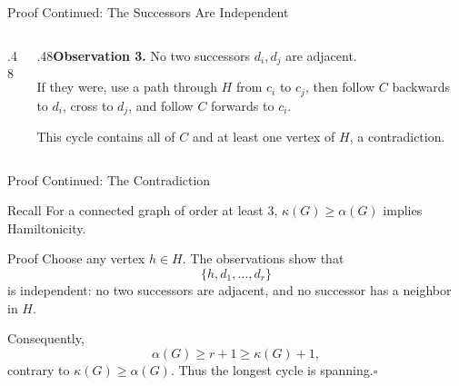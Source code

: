 \documentclass[aspectratio=169,11pt]{beamer}
\begin{document}
\begin{frame}{Proof Continued: The Successors Are Independent}
\large
\begin{columns}[c,onlytextwidth]\begin{column}{.48\textwidth}\begin{center}\end{center}\end{column}\begin{column}{.48\textwidth}\textbf{Observation 3.} No two successors $d_i,d_j$ are adjacent.\par\medskip If they were, use a path through $H$ from $c_i$ to $c_j$, then follow $C$ backwards to $d_i$, cross to $d_j$, and follow $C$ forwards to $c_i$.\par\medskip This cycle contains all of $C$ and at least one vertex of $H$, a contradiction.\end{column}\end{columns}
\end{frame}

\begin{frame}{Proof Continued: The Contradiction}
\large
\begin{block}{Recall}
For a connected graph of order at least $3$, $\kappa(G)\ge\alpha(G)$ implies Hamiltonicity.
\end{block}
\begin{block}{Proof}
\normalsize Choose any vertex $h\in H$. The observations show that\[\{h,d_1,\ldots,d_r\}\]is independent: no two successors are adjacent, and no successor has a neighbor in $H$.\par\medskip Consequently,\[\alpha(G)\ge r+1\ge\kappa(G)+1,\]contrary to $\kappa(G)\ge\alpha(G)$. Thus the longest cycle is spanning.\hfill$\square$
\end{block}

\end{frame}
\end{document}
